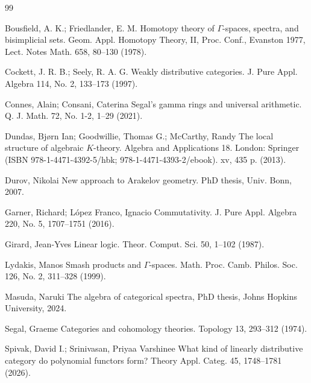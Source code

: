 \documentclass{article}
\numberwithin{equation}{section}
\theoremstyle{definition}
\begin{document}
\begin{thebibliography}{99}


Bousfield, A. K.; Friedlander, E. M.
Homotopy theory of $\Gamma$-spaces, spectra, and bisimplicial sets. Geom. Appl. Homotopy Theory, II, Proc. Conf., Evanston 1977, Lect. Notes Math. 658, 80--130 (1978).

Cockett, J. R. B.; Seely, R. A. G.
Weakly distributive categories. J. Pure Appl. Algebra 114, No. 2, 133--173 (1997).


Connes, Alain; Consani, Caterina
Segal’s gamma rings and universal arithmetic. Q. J. Math. 72, No. 1-2, 1--29 (2021).

Dundas, Bj{\o}rn Ian; Goodwillie, Thomas G.; McCarthy, Randy
The local structure of algebraic $K$-theory.
Algebra and Applications 18. London: Springer (ISBN 978-1-4471-4392-5/hbk; 978-1-4471-4393-2/ebook). xv, 435 p. (2013).

Durov, Nikolai
New approach to Arakelov geometry. 
PhD thesis, Univ. Bonn, 2007.

Garner, Richard; L{\'o}pez Franco, Ignacio
Commutativity. J. Pure Appl. Algebra 220, No. 5, 1707--1751 (2016).

Girard, Jean-Yves
Linear logic. Theor. Comput. Sci. 50, 1--102 (1987).

Lydakis, Manos
Smash products and $\Gamma$-spaces. Math. Proc. Camb. Philos. Soc. 126, No. 2, 311--328 (1999).


 Masuda, Naruki
The algebra of categorical spectra, 
PhD thesis, Johns Hopkins University, 2024.



Segal, Graeme
Categories and cohomology theories. Topology 13, 293--312 (1974).

Spivak, David I.; Srinivasan, Priyaa Varshinee
What kind of linearly distributive category do polynomial functors form? Theory Appl. Categ. 45, 1748--1781 (2026).




\end{thebibliography}
\end{document}
